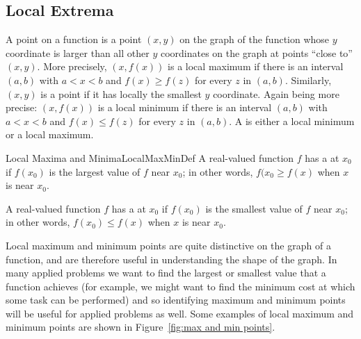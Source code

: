 \subsection{Local Extrema}\label{subsec:LocalExtremaSubsection}
A  point on a function is a
point $(x,y)$ on the graph of the function whose $y$ coordinate is
larger than all other $y$ coordinates on the graph at points ``close
to'' $(x,y)$. More precisely, $(x,f(x))$ is a local maximum if there
is an interval $(a,b)$ with $a<x<b$ and $f(x)\ge f(z)$ for every $z$
in $(a,b)$. Similarly, $(x,y)$ is a  point
if it has locally the smallest $y$ coordinate. Again
being more precise: $(x,f(x))$ is a local minimum if there
is an interval $(a,b)$ with $a<x<b$ and $f(x)\le f(z)$ for every $z$
in $(a,b)$. A  is either a local minimum or a local maximum.

\begin{definition}{Local Maxima and Minima}{LocalMaxMinDef}
A real-valued function $f$ has a  at $x_0$ if $f(x_0)$
is the largest value of $f$ near $x_0$; in other words, $f(x_0\geq f(x)$
when $x$ is near $x_0$.

\medskip
A real-valued function $f$ has a  at $x_0$ if $f(x_0)$
is the smallest value of $f$ near $x_0$; in other words, $f(x_0)\leq f(x)$
when $x$ is near $x_0$.
\end{definition}

Local maximum and minimum points are quite distinctive on the graph of
a function, and are therefore useful in understanding the shape of the
graph. In many applied problems we want to find the largest or
smallest value that a function achieves (for example, we might want
to find the minimum cost at which some task can be performed) and so
identifying maximum and minimum points will be useful for applied
problems as well. Some examples of local maximum and minimum points
are shown in Figure~\ref{fig:max and min points}.

